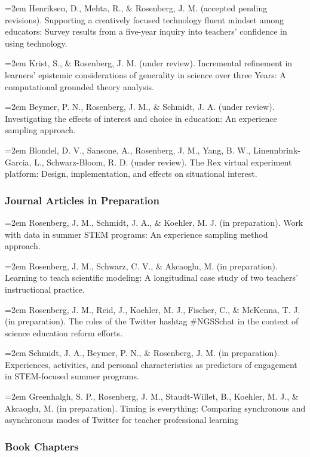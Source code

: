 \documentclass[]{article}
\begin{document}
\hangindent=2em Henriksen, D., Mehta, R., \& Rosenberg, J. M. (accepted
pending revisions). Supporting a creatively focused technology fluent
mindset among educators: Survey results from a five-year inquiry into
teachers' confidence in using technology.

\hangindent=2em Krist, S., \& Rosenberg, J. M. (under review).
Incremental refinement in learners' epistemic considerations of
generality in science over three Years: A computational grounded theory
analysis.

\hangindent=2em Beymer, P. N., Rosenberg, J. M., \& Schmidt, J. A.
(under review). Investigating the effects of interest and choice in
education: An experience sampling approach.

\hangindent=2em Blondel, D. V., Sansone, A., Rosenberg, J. M., Yang, B.
W., Linennbrink-Garcia, L., Schwarz-Bloom, R. D. (under review). The Rex
virtual experiment platform: Design, implementation, and effects on
situational interest.

\subsubsection{Journal Articles in
Preparation}\label{journal-articles-in-preparation}

\hangindent=2em Rosenberg, J. M., Schmidt, J. A., \& Koehler, M. J. (in
preparation). Work with data in summer STEM programs: An experience
sampling method approach.

\hangindent=2em Rosenberg, J. M., Schwarz, C. V., \& Akcaoglu, M. (in
preparation). Learning to teach scientific modeling: A longitudinal case
study of two teachers' instructional practice.

\hangindent=2em Rosenberg, J. M., Reid, J., Koehler, M. J., Fischer, C.,
\& McKenna, T. J. (in preparation). The roles of the Twitter hashtag
\#NGSSchat in the context of science education reform efforts.

\hangindent=2em Schmidt, J. A., Beymer, P. N., \& Rosenberg, J. M. (in
preparation). Experiences, activities, and personal characteristics as
predictors of engagement in STEM-focused summer programs.

\hangindent=2em Greenhalgh, S. P., Rosenberg, J. M., Staudt-Willet, B.,
Koehler, M. J., \& Akcaoglu, M. (in preparation). Timing is everything:
Comparing synchronous and asynchronous modes of Twitter for teacher
professional learning

\subsubsection{Book Chapters}\label{book-chapters}
\end{document}
